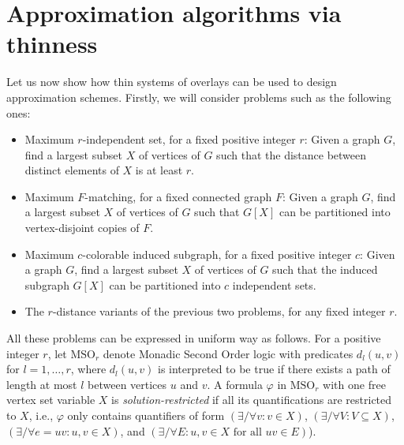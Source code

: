 \documentclass[a4paper,11pt]{article}
\begin{document}
\section{Approximation algorithms via thinness}\label{sec-approx}

Let us now show how thin systems of overlays can be used to design approximation schemes.
Firstly, we will consider problems such as the following ones:
\begin{itemize}
\item Maximum $r$-independent set, for a fixed positive integer $r$: Given a graph $G$, find a largest subset $X$ of vertices of $G$ such that the distance
between distinct elements of $X$ is at least $r$.
\item Maximum $F$-matching, for a fixed connected graph $F$: Given a graph $G$, find a largest subset $X$ of vertices of $G$ such that $G[X]$ can be partitioned into
vertex-disjoint copies of $F$.
\item Maximum $c$-colorable induced subgraph, for a fixed positive integer $c$: Given a graph $G$, find a largest subset $X$ of vertices of $G$ such that
the induced subgraph $G[X]$ can be partitioned into $c$ independent sets.
\item The $r$-distance variants of the previous two problems, for any fixed integer $r$.
\end{itemize}

All these problems can be expressed in uniform way as follows.
For a positive integer $r$, let $\text{MSO}_r$ denote Monadic Second Order logic with predicates $d_l(u,v)$ for $l=1,\ldots,r$,
where $d_l(u,v)$ is interpreted to be true if there exists a path of length at most $l$ between vertices $u$ and $v$.
A formula $\varphi$ in $\text{MSO}_r$ with one free vertex set variable $X$ is \emph{solution-restricted}
if all its quantifications are restricted to $X$, i.e., $\varphi$ only contains quantifiers of form
$(\exists/\forall v:v\in X)$, $(\exists/\forall V:V\subseteq X)$, $(\exists/\forall e=uv:u,v\in X)$, and
$(\exists/\forall E:u,v\in X\text{ for all }uv\in E)$).
\end{document}
